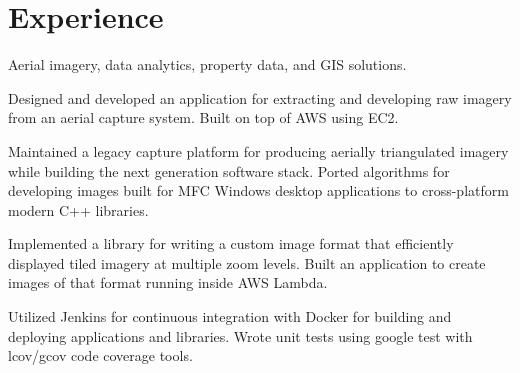 \documentclass[letterpaper]{fowles-resume} %
\begin{document}
\begin{minipage}[t]{0.33\textwidth}


\sectionspace %



\end{minipage} %
\hfill
%
%
\begin{minipage}[t]{0.66\textwidth} %


\section{Experience}
Aerial imagery, data analytics, property data, and GIS solutions. 
\vspace{\topsep}
\begin{tightitemize}
\item Designed and developed an application for extracting and developing raw imagery from an aerial capture system. Built on top of AWS using EC2. 
\item Maintained a legacy capture platform for producing aerially triangulated imagery while building the next generation software stack. Ported algorithms for developing images built for MFC Windows desktop applications to cross-platform modern C++ libraries.
\item Implemented a library for writing a custom image format that efficiently displayed tiled imagery at multiple zoom levels. Built an application to create images of that format running inside AWS Lambda.
\item Utilized Jenkins for continuous integration with Docker for building and deploying applications and libraries. Wrote unit tests using google test with lcov/gcov code coverage tools.
\end{tightitemize}


\end{minipage}
\end{document}
